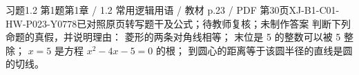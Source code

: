 \par\noindent\begin{minipage}{\linewidth}
\begin{bankitem}{习题1.2 第1题}{第1章 / 1.2 常用逻辑用语 / 教材 p.23 / PDF 第30页}{XJ-B1-C01-HW-P023-Y0778}{已对照原页转写题干及公式；待教师复核；未制作答案}
判断下列命题的真假，并说明理由：
菱形的两条对角线相等；
末位是 5 的整数可以被 5 整除；
$x=5$ 是方程 $x^2-4x-5=0$ 的根；
到圆心的距离等于该圆半径的直线是圆的切线。
\end{bankitem}
\end{minipage}\par\medskip
